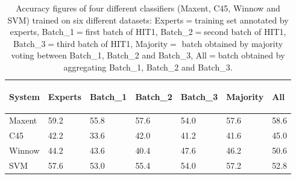 \documentclass[11pt,letterpaper]{article}
\begin{document}
\begin{table}
\begin{center}
\begin{small}
\begin{tabular}{|l|l|l|l|l|l|l|} \hline
 System & 
 {\begin{sideways}\parbox{2cm}{\centering Experts}\end{sideways}} &
 {\begin{sideways}\parbox{2cm}{\centering Batch\_1}\end{sideways}} &
 {\begin{sideways}\parbox{2cm}{\centering Batch\_2}\end{sideways}} &
 {\begin{sideways}\parbox{2cm}{\centering Batch\_3}\end{sideways}} &
 {\begin{sideways}\parbox{2cm}{\centering Majority}\end{sideways}} &
 {\begin{sideways}\parbox{2cm}{\centering All}\end{sideways}} \\ \hline
 Maxent & 59.2 & 55.8 & 57.6 & 54.0 & 57.6 & 58.6 \\ \hline
 C45 & 42.2 & 33.6 & 42.0 & 41.2 & 41.6 & 45.0 \\ \hline
 Winnow & 44.2 & 43.6 & 40.4 & 47.6 & 46.2 & 50.6 \\ \hline
 SVM & 57.6 & 53.0 & 55.4 & 54.0 & 57.2 & 52.8 \\ \hline
\end{tabular}
\end{small}
\end{center}
\caption{Accuracy figures of four different classifiers (Maxent, C45, Winnow and SVM) trained on six different datasets: Experts$=$training set annotated by experts, Batch\_1$=$first batch of HIT1, Batch\_2$=$second batch of HIT1, Batch\_3$=$third batch of HIT1, Majority$=$ batch obtained by majority voting between Batch\_1, Batch\_2 and Batch\_3, All$=$batch obtained by aggregating Batch\_1, Batch\_2 and Batch\_3.}
\label{table:amtvsexp}
\end{table}

\end{document}
